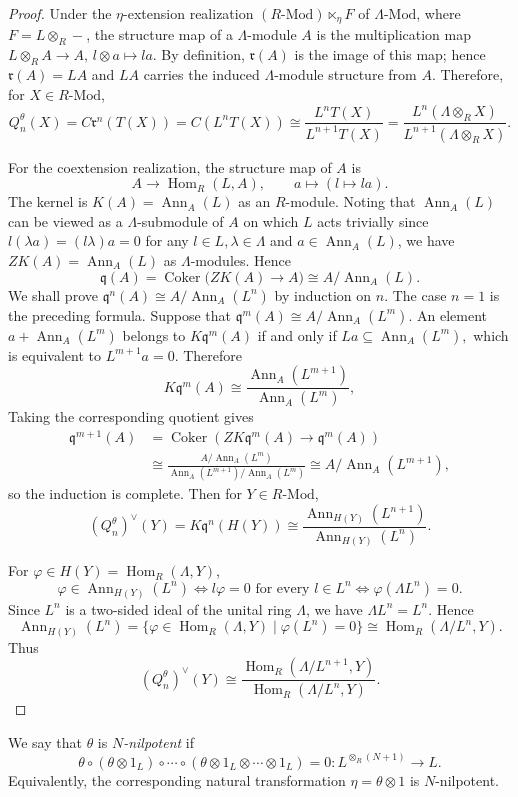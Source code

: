 \documentclass[11pt,reqno]{amsart}
\numberwithin{equation}{section}
\newcommand{\Hom}{\operatorname{Hom}}
\newcommand{\Coker}{\operatorname{Coker}}
\newcommand{\Mod}{\text{-}\mathrm{Mod}}
\newcommand{\radf}{\mathfrak r}
\newcommand{\coradf}{\mathfrak q}
\newcommand{\Ann}{\operatorname{Ann}}
\begin{document}
\begin{proof}
Under the $\eta$-extension realization $(R\text{-Mod})\ltimes_\eta F$ of $\Lambda\text{-Mod}$, where
\(F=L\otimes_R-\), the structure map of a $\Lambda$-module $A$ is the multiplication map
$
L\otimes_RA\to A,
\, l\otimes a\mapsto la.
$
By definition, $\radf(A)$ is the image of this map; hence
\(\radf(A)=LA\) and $LA$ carries the induced $\Lambda$-module structure from $A$.
Therefore, for $X\in R\Mod$,
\[
Q_n^\theta(X)=C\radf^n(T(X))
=C(L^nT(X))
\cong
\frac{L^nT(X)}{L^{n+1}T(X)}=\frac{L^n(\Lambda\otimes_RX)}{L^{n+1}(\Lambda\otimes_RX)}.
\]

For the coextension realization, the structure map of $A$ is
\[
A\longrightarrow \Hom_R(L,A),
\qquad
a\longmapsto(l\mapsto la).
\]
The kernel is $K(A)=\Ann_A(L)$ as an $R$-module. Noting that $\Ann_A(L)$ can be viewed as a $\Lambda$-submodule of $A$  on which $L$ acts trivially since
$
l(\lambda a) =(l\lambda)a=0
$
for any $l\in L, \lambda\in \Lambda$ and $a\in \Ann_A(L)$, we have $ZK(A)=\Ann_A(L)$ as $\Lambda$-modules. Hence
\[
\coradf(A)=\Coker\bigl(ZK(A)\to A\bigr)
\cong A/\Ann_A(L).
\]
We shall prove $\coradf^n(A)\cong A/\Ann_A(L^n)$ by induction on $n$. The case $n=1$ is the preceding formula. Suppose that
$
\coradf^m(A)\cong A/\Ann_A(L^m).
$
An element $a+\Ann_A(L^m)$ belongs to
\(K\coradf^m(A)\) if and only if
$
L a\subseteq \Ann_A(L^m),
$
which is equivalent to
$
L^{m+1}a=0.
$
Therefore
\[
K\coradf^m(A)
\cong
\frac{\Ann_A(L^{m+1})}{\Ann_A(L^m)},
\]
Taking the corresponding quotient gives
\[
\begin{aligned}
\coradf^{m+1}(A)&=\Coker(ZK\coradf^m(A)\to \coradf^m(A))\\
&\cong
\frac{A/\Ann_A(L^m)}
     {\Ann_A(L^{m+1})/\Ann_A(L^m)}
\cong
A/\Ann_A(L^{m+1}),
\end{aligned}
\]
so the induction is complete. Then for $Y\in R\text{-Mod}$,
\[
(Q_n^\theta)^\vee(Y) = K\coradf^n(H(Y))
\cong
\frac{\Ann_{H(Y)}(L^{n+1})}{\Ann_{H(Y)}(L^n)}.
\]

For
\(\varphi\in H(Y)=\Hom_R(\Lambda,Y)\),
\[
\varphi\in\Ann_{H(Y)}(L^n)
\iff
l\varphi=0\text{ for every }l\in L^n
\iff
\varphi(\Lambda L^n)=0.
\]
Since $L^n$ is a two-sided ideal of the unital ring $\Lambda$, we have
\(\Lambda L^n=L^n\). Hence
\[
\Ann_{H(Y)}(L^n)
=
\{\varphi\in\Hom_R(\Lambda,Y)\mid \varphi(L^n)=0\}
\cong
\Hom_R(\Lambda/L^n,Y).
\]
Thus
\[
(Q_n^\theta)^\vee(Y)\cong \frac{\Hom_R(\Lambda/L^{n+1},Y)}{\Hom_R(\Lambda/L^n,Y)}.
\]
\end{proof}

We say that $\theta$ is \emph{$N$-nilpotent} if
\[
\theta\circ (\theta\otimes 1_L)\circ\cdots \circ (\theta\otimes 1_L\otimes \cdots\otimes 1_L)=0\colon L^{\otimes_R(N+1)}\to L.
\]
Equivalently, the corresponding natural transformation $\eta=\theta\otimes 1$ is $N$-nilpotent.
\end{document}
